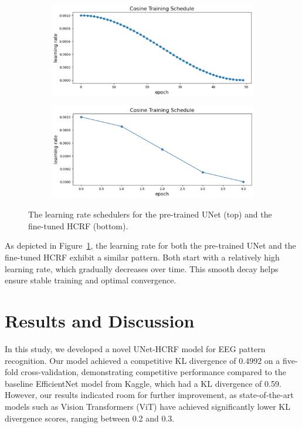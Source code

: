 \documentclass[conference]{IEEEtran}
\begin{document}
\begin{figure}[tbp]
\centering
\begin{subfigure}[b]{0.45\textwidth}
\includegraphics[width=\textwidth]{pretrain}
\end{subfigure}
\hfill
\begin{subfigure}[b]{0.45\textwidth}
\includegraphics[width=\textwidth]{finetune}
\end{subfigure}
\caption{The learning rate schedulers for the pre-trained UNet (top) and
the fine-tuned HCRF (bottom).}
\label{fig:cos}
\end{figure}


As depicted in Figure~\ref{fig:cos}, the learning rate for both the pre-trained
UNet and the fine-tuned HCRF exhibit a similar pattern. Both start with a
relatively high learning rate, which gradually decreases over time.
This smooth decay helps ensure stable training and optimal convergence.


\section{Results and Discussion}


In this study, we developed a novel UNet-HCRF model for EEG pattern recognition.
Our model achieved a competitive KL divergence of 0.4992 on a five-fold
cross-validation, demonstrating competitive performance compared to the
baseline EfficientNet model from Kaggle, which had a KL divergence of 0.59.
However, our results indicated room for further improvement, as state-of-the-art
models such as Vision Transformers (ViT) have achieved significantly lower KL
divergence scores, ranging between 0.2 and 0.3.
\end{document}
